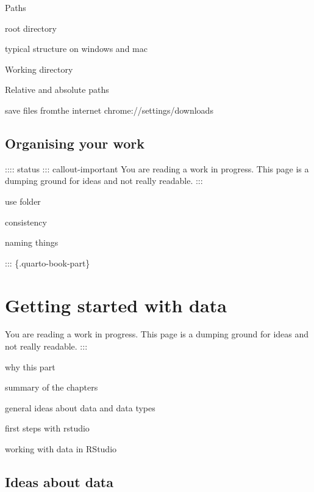 \documentclass[
  letterpaper,
  DIV=11,
  numbers=noendperiod]{scrreprt}
\begin{document}
Paths

root directory

typical structure on windows and mac

Working directory

Relative and absolute paths

save files fromthe internet chrome://settings/downloads

\hypertarget{organising-your-work}{%
\chapter{Organising your work}\label{organising-your-work}}

:::: status ::: callout-important You are reading a work in progress.
This page is a dumping ground for ideas and not really readable. :::

use folder

consistency

naming things

::: \{.quarto-book-part\}

\part{Getting started with data}

\begin{tcolorbox}[enhanced jigsaw, opacitybacktitle=0.6, toprule=.15mm, arc=.35mm, colback=white, colframe=quarto-callout-important-color-frame, opacityback=0, titlerule=0mm, colbacktitle=quarto-callout-important-color!10!white, leftrule=.75mm, breakable, bottomtitle=1mm, toptitle=1mm, title=\textcolor{quarto-callout-important-color}{\faExclamation}\hspace{0.5em}{Important}, rightrule=.15mm, bottomrule=.15mm, coltitle=black, left=2mm]

You are reading a work in progress. This page is a dumping ground for
ideas and not really readable. :::

\end{tcolorbox}

why this part

summary of the chapters

general ideas about data and data types

first steps with rstudio

working with data in RStudio

\hypertarget{ideas-about-data}{%
\chapter{Ideas about data}\label{ideas-about-data}}
\end{document}
